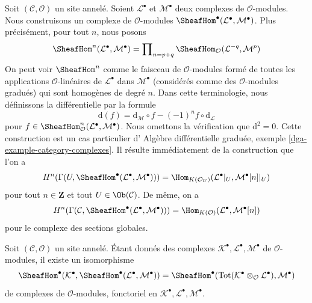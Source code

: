 \noindent
Soit $(\mathcal{C}, \mathcal{O})$ un site annelé. Soient
$\mathcal{L}^\bullet$ et $\mathcal{M}^\bullet$ deux complexes
de $\mathcal{O}$-modules. Nous construisons un complexe
de $\mathcal{O}$-modules
$\SheafHom^\bullet(\mathcal{L}^\bullet, \mathcal{M}^\bullet)$.
Plus précisément, pour tout $n$, nous posons
$$
\SheafHom^n(\mathcal{L}^\bullet, \mathcal{M}^\bullet) =
\prod\nolimits_{n = p + q}
\SheafHom_\mathcal{O}(\mathcal{L}^{-q}, \mathcal{M}^p)
$$
On peut voir $\SheafHom^n$ comme le faisceau de
$\mathcal{O}$-modules formé de toutes les applications $\mathcal{O}$-linéaires
de $\mathcal{L}^\bullet$ dans $\mathcal{M}^\bullet$
(considérés comme des $\mathcal{O}$-modules gradués) qui sont homogènes
de degré $n$. Dans cette terminologie, nous définissons la différentielle par la formule
$$
\text{d}(f) =
\text{d}_\mathcal{M} \circ f - (-1)^n f \circ \text{d}_\mathcal{L}
$$
pour
$f \in \SheafHom^n_\mathcal{O}(\mathcal{L}^\bullet, \mathcal{M}^\bullet)$.
Nous omettons la vérification que $\text{d}^2 = 0$.
Cette construction est un cas particulier d'
Algèbre différentielle graduée, exemple \ref{dga-example-category-complexes}.
Il résulte immédiatement de la construction que l'on a
\begin{equation}
\label{equation-cohomology-hom-complex}
H^n(\Gamma(U, \SheafHom^\bullet(\mathcal{L}^\bullet, \mathcal{M}^\bullet))) =
\Hom_{K(\mathcal{O}_U)}(\mathcal{L}^\bullet|_U, \mathcal{M}^\bullet[n]|_U)
\end{equation}
pour tout $n \in \mathbf{Z}$ et tout $U \in \Ob(\mathcal{C})$. De même,
on a
\begin{equation}
\label{equation-global-cohomology-hom-complex}
H^n(\Gamma(\mathcal{C},
\SheafHom^\bullet(\mathcal{L}^\bullet, \mathcal{M}^\bullet))) =
\Hom_{K(\mathcal{O})}(\mathcal{L}^\bullet, \mathcal{M}^\bullet[n])
\end{equation}
pour le complexe des sections globales.

\begin{lemma}
\label{lemma-compose}
Soit $(\mathcal{C}, \mathcal{O})$ un site annelé.
Étant donnés des complexes $\mathcal{K}^\bullet, \mathcal{L}^\bullet, \mathcal{M}^\bullet$
de $\mathcal{O}$-modules, il existe un isomorphisme
$$
\SheafHom^\bullet(\mathcal{K}^\bullet,
\SheafHom^\bullet(\mathcal{L}^\bullet, \mathcal{M}^\bullet))
=
\SheafHom^\bullet(\text{Tot}(\mathcal{K}^\bullet \otimes_\mathcal{O}
\mathcal{L}^\bullet), \mathcal{M}^\bullet)
$$
de complexes de $\mathcal{O}$-modules, fonctoriel en
$\mathcal{K}^\bullet, \mathcal{L}^\bullet, \mathcal{M}^\bullet$.
\end{lemma}

